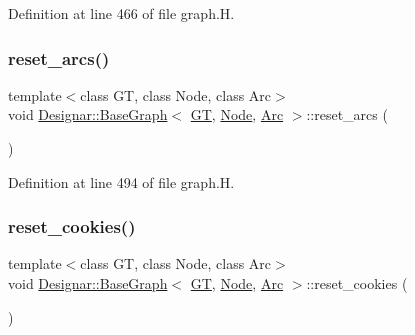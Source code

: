 Definition at line 466 of file graph.\+H.

\mbox{\label{class_designar_1_1_base_graph_a6dc66191c2d752bf7f67a4522a7830e3}} 
\subsubsection{\texorpdfstring{reset\+\_\+arcs()}{reset\_arcs()}}
{\footnotesize\ttfamily template$<$class GT, class Node, class Arc$>$ \\
void \hyperlink{class_designar_1_1_base_graph}{Designar\+::\+Base\+Graph}$<$ \hyperlink{demo-buildgraph_8_c_a3001c40d2c31ca87ed96cd7d1334a55e}{GT}, \hyperlink{namespace_designar_a5af326c65aa2bd26b26c410f2030d09e}{Node}, \hyperlink{namespace_designar_a3f55fb5513d62ff47cbc8f72b8e95d6f}{Arc} $>$\+::reset\+\_\+arcs (\begin{DoxyParamCaption}{ }\end{DoxyParamCaption})\hspace{0.3cm}{\ttfamily [inline]}}



Definition at line 494 of file graph.\+H.

\mbox{\label{class_designar_1_1_base_graph_a96a630fd589c34e7e6242f4349606e1c}} 
\subsubsection{\texorpdfstring{reset\+\_\+cookies()}{reset\_cookies()}}
{\footnotesize\ttfamily template$<$class GT, class Node, class Arc$>$ \\
void \hyperlink{class_designar_1_1_base_graph}{Designar\+::\+Base\+Graph}$<$ \hyperlink{demo-buildgraph_8_c_a3001c40d2c31ca87ed96cd7d1334a55e}{GT}, \hyperlink{namespace_designar_a5af326c65aa2bd26b26c410f2030d09e}{Node}, \hyperlink{namespace_designar_a3f55fb5513d62ff47cbc8f72b8e95d6f}{Arc} $>$\+::reset\+\_\+cookies (\begin{DoxyParamCaption}{ }\end{DoxyParamCaption})\hspace{0.3cm}{\ttfamily [inline]}}



